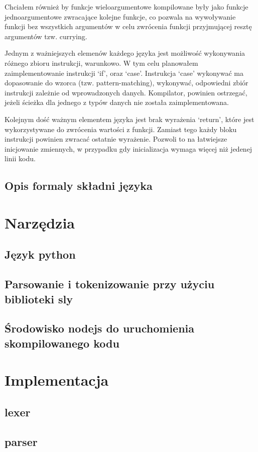\documentclass{article}
\begin{document}
Chciałem również by funkcje wieloargumentowe kompilowane były jako funkcje jednoargumentowe zwracające kolejne funkcje, co pozwala na wywoływanie funkcji bez wszystkich argumentów w celu zwrócenia funkcji przyjmującej resztę argumentów tzw. currying. 


Jednym z ważniejszych elemenów każdego języka jest możliwość wykonywania różnego zbioru instrukcji, warunkowo. W tym celu planowałem zaimplementowanie instrukcji `if', oraz `case'. Instrukcja `case' wykonywać ma dopasowanie do wzorca (tzw. pattern-matching), wykonywać, odpowiedni zbiór instrukcji zależnie od wprowadzonych danych. Kompilator, powinien ostrzegać, jeżeli ścieżka dla jednego z typów danych nie została zaimplementowana.

Kolejnym dość ważnym elementem języka jest brak wyrażenia `return', które jest wykorzystywane do zwrócenia wartości z funkcji. Zamiast tego każdy bloku instrukcji powinien zwracać ostatnie wyrażenie. Pozwoli to na łatwiejsze inicjowanie zmiennych, w przypadku gdy inicializacja wymaga więcej niż jedenej linii kodu. 

\subsection{Opis formaly składni języka}
\section{Narzędzia}
\subsection{Język python}
\subsection{Parsowanie i tokenizowanie przy użyciu biblioteki sly}
\subsection{Środowisko nodejs do uruchomienia skompilowanego kodu}
\section{Implementacja}
\subsection{lexer}
\subsection{parser}
\end{document}
